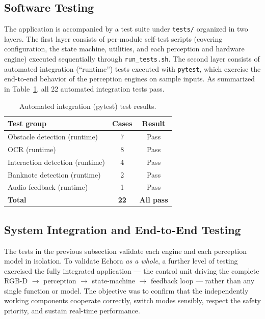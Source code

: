\subsection{Software Testing}

The application is accompanied by a test suite under \texttt{tests/} organized in two layers. The first layer consists of per-module self-test scripts (covering configuration, the state machine, utilities, and each perception and hardware engine) executed sequentially through \texttt{run\_tests.sh}. The second layer consists of automated integration (``runtime'') tests executed with \texttt{pytest}, which exercise the end-to-end behavior of the perception engines on sample inputs. As summarized in Table~\ref{tab:sw_tests}, all 22 automated integration tests pass.

\begin{table}[H]
\centering
\begin{tabular}{|l|c|c|}
\hline
\textbf{Test group} & \textbf{Cases} & \textbf{Result} \\
\hline
Obstacle detection (runtime) & 7 & Pass \\
\hline
OCR (runtime) & 8 & Pass \\
\hline
Interaction detection (runtime) & 4 & Pass \\
\hline
Banknote detection (runtime) & 2 & Pass \\
\hline
Audio feedback (runtime) & 1 & Pass \\
\hline
\textbf{Total} & \textbf{22} & \textbf{All pass} \\
\hline
\end{tabular}
\caption{Automated integration (pytest) test results.}
\label{tab:sw_tests}
\end{table}

\subsection{System Integration and End-to-End Testing}

The tests in the previous subsection validate each engine and each perception model in isolation. To validate Echora \emph{as a whole}, a further level of testing exercised the fully integrated application --- the control unit driving the complete RGB-D $\rightarrow$ perception $\rightarrow$ state-machine $\rightarrow$ feedback loop --- rather than any single function or model. The objective was to confirm that the independently working components cooperate correctly, switch modes sensibly, respect the safety priority, and sustain real-time performance.

